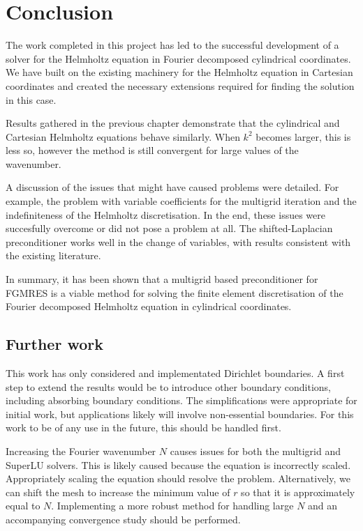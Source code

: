 \chapter{Conclusion}

The work completed in this project has led to the successful development of a solver for the Helmholtz equation in Fourier decomposed cylindrical coordinates.
We have built on the existing machinery for the Helmholtz equation in Cartesian coordinates and created the necessary extensions required for finding the solution in this case.

Results gathered in the previous chapter demonstrate that the cylindrical and Cartesian Helmholtz equations behave similarly.
When $k^2$ becomes larger, this is less so, however the method is still convergent for large values of the wavenumber.

A discussion of the issues that might have caused problems were detailed.
For example, the problem with variable coefficients for the multigrid iteration and the indefiniteness of the Helmholtz discretisation.
In the end, these issues were succesfully overcome or did not pose a problem at all.
The shifted-Laplacian preconditioner works well in the change of variables, with results consistent with the existing literature.

In summary, it has been shown that a multigrid based preconditioner for FGMRES is a viable method for solving the finite element discretisation of the Fourier decomposed Helmholtz equation in cylindrical coordinates.






\section{Further work}

This work has only considered and implementated Dirichlet boundaries.
A first step to extend the results would be to introduce other boundary conditions, including absorbing boundary conditions.
The simplifications were appropriate for initial work, but applications likely will involve non-essential boundaries.
For this work to be of any use in the future, this should be handled first.

Increasing the Fourier wavenumber $N$ causes issues for both the multigrid and SuperLU solvers.
This is likely caused because the equation is incorrectly scaled.
Appropriately scaling the equation should resolve the problem.
Alternatively, we can shift the mesh to increase the minimum value of $r$ so that it is approximately equal to $N$.
Implementing a more robust method for handling large $N$ and an accompanying convergence study should be performed.

